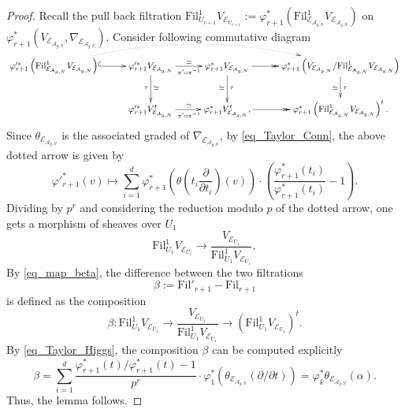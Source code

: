 \documentclass[12pt,twoside]{book}
\theoremstyle{plain}
\theoremstyle{definition}
\theoremstyle{remark}
\numberwithin{equation}{section}
\begin{document}
\begin{proof}
Recall the pull back filtration $\mathrm{Fil}^1_{U_{r+1}}V_{\mathcal E_{U_{r+1}}} := \varphi_{r+1}^*\left(\mathrm{Fil}^1_{\mathcal E_{{\mathcal A_{g,N}}}}V_{\mathcal E_{{\mathcal A_{g,N}}}}\right)$ on $\varphi_{r+1}^*(V_{\mathcal E_{{\mathcal A_{g,N}}}},\nabla_{\mathcal E_{{\mathcal A_{g,N}}}})$. Consider following commutative diagram
\begin{equation*}
\xymatrix@C=1cm{
\varphi'^*_{r+1}\left(\mathrm{Fil}^1_{\mathcal E_{{\mathcal A_{g,N}}}}V_{\mathcal E_{{\mathcal A_{g,N}}}}\right)
\ar@{^(->}[r]
\ar@{..>}@/^25pt/[rrr]
&
\varphi'^*_{r+1}V_{\mathcal E_{{\mathcal A_{g,N}}}} \ar[r]^\simeq_{\pi'\circ\pi^{-1}}
\ar[d]_{\tau}^{\simeq}
&
\varphi_{r+1}^*V_{\mathcal E_{{\mathcal A_{g,N}}}} \ar[d]^{\tau}_{\simeq} \ar@{->>}[r]
&
\varphi_{r+1}^*\left(V_{\mathcal E_{{\mathcal A_{g,N}}}}/\mathrm{Fil}^1_{\mathcal E_{{\mathcal A_{g,N}}}}V_{\mathcal E_{{\mathcal A_{g,N}}}}\right) \ar[d]^{\tau}_{\simeq}
\\
&
\varphi'^*_{r+1}V^t_{\mathcal E_{{\mathcal A_{g,N}}}} \ar[r]^\simeq_{\pi'\circ\pi^{-1}}
&
\varphi_{r+1}^*V^t_{\mathcal E_{{\mathcal A_{g,N}}}},\ar@{->>}[r]
&\varphi_{r+1}^*\left(\mathrm{Fil}^1_{\mathcal E_{{\mathcal A_{g,N}}}}V_{\mathcal E_{{\mathcal A_{g,N}}}}\right)^t.
\\
}
\end{equation*}
Since $\theta_{\mathcal E_{{\mathcal A_{g,N}}}}$ is the associated graded of $\nabla_{\mathcal E_{{\mathcal A_{g,N}}}}$, by \eqref{eq_Taylor_Conn}, the above dotted arrow is given by
\begin{equation} \label{eq_Taylor_Higgs}
\varphi'^*_{r+1}(v) \mapsto \sum_{i=1}^{d}\varphi_{r+1}^*\left(\theta\left(t_i\frac{\partial}{\partial t_i}\right)(v)\right) \cdot \left(\frac{\varphi^*_{r+1}(t_i)}{\varphi^*_{r+1}(t_i)}-1\right).
\end{equation}
Dividing by $p^r$ and considering the reduction modulo $p$ of the dotted arrow, one gets a morphism of sheaves over $U_{1}$
\[\mathrm{Fil}^1_{U_{1}}V_{\mathcal E_{U_{1}}}
\rightarrow
\frac{V_{\mathcal E_{U_{1}}}}
{\mathrm{Fil}^1_{U_{1}}V_{\mathcal E_{U_{1}}}},\]
By \eqref{eq_map_beta}, the difference between the two filtrations
\[\beta := \mathrm{Fil}'_{r+1} - \mathrm{Fil}_{r+1}\]
is defined as the composition
\[\beta\colon
\mathrm{Fil}^1_{U_{1}}V_{\mathcal E_{U_{1}}}
\rightarrow
\frac{V_{\mathcal E_{U_{1}}}}
{\mathrm{Fil}^1_{U_{1}}V_{\mathcal E_{U_{1}}}} \rightarrow \left(\mathrm{Fil}^1_{U_{1}}V_{\mathcal E_{U_{1}}}\right)^t.\]
By \eqref{eq_Taylor_Higgs}, the composition $\beta$ can be computed explicitly
\begin{equation} \label{beta_ij:explicite}
\beta = \sum_{i=1}^d \frac{\varphi_{r+1}^*(t)/\varphi^*_{r+1}(t)-1}{p^r} \cdot \varphi_1^*\left( \theta_{\mathcal E_{{\mathcal A_{g,N}}}}(\partial/\partial t)\right) = \varphi_k^*\theta_{\mathcal E_{{\mathcal A_{g,N}}}}(\alpha).
\end{equation}
Thus, the lemma follows.
\end{proof}
\end{document}
